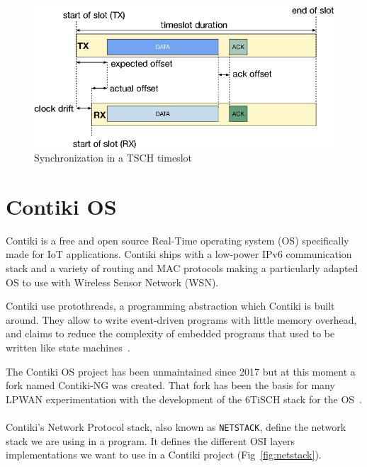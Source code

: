 \begin{figure}[H]
  \centering
  \includegraphics[width=\textwidth]{thesis.tex/chapters/context/fig/sync.png}
  \caption{Synchronization in a TSCH timeslot\cite{TELESHERMETO201784}\label{fig:sync}}
\end{figure}



\section{Contiki OS}

Contiki is a free and open source Real-Time operating system (OS) specifically made
for IoT applications. Contiki ships with a low-power IPv6 communication stack
and a variety of routing and MAC protocols making a particularly adapted OS to
use with Wireless Sensor Network (WSN).

Contiki use protothreads, a programming abstraction which Contiki is
built around.
They allow to write event-driven programs with little memory overhead, and
claims to reduce the complexity of embedded programs that used to be written 
like state machines~\cite{10.1145/1182807.1182811}.

The Contiki OS project has been unmaintained since 2017 but at this moment a
fork named Contiki-NG was created.
That fork has been the basis for many LPWAN experimentation with the
development of the 6TiSCH stack for the OS~\cite{Duquennoy2017TSCHA6}.

\paragraph{}

Contiki's Network Protocol stack, also known as \lstinline{NETSTACK}, define
the network stack we are using in a program.
It defines the different OSI layers implementations we 
want to use in a Contiki project (Fig~\ref{fig:netstack}).

